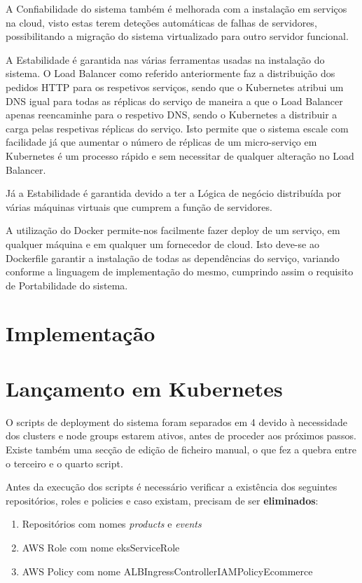 \documentclass[11pt,a4paper]{article}
\begin{document}
A Confiabilidade do sistema também é melhorada com a instalação em serviços na cloud, visto estas terem deteções automáticas de falhas de servidores, possibilitando a migração do sistema virtualizado para outro servidor funcional.
\newline

A Estabilidade é garantida nas várias ferramentas usadas na instalação do sistema. O Load Balancer como referido anteriormente faz a distribuição dos pedidos HTTP para os respetivos serviços, sendo que o Kubernetes atribui um DNS igual para todas as réplicas do serviço de maneira a que o Load Balancer apenas reencaminhe para o respetivo DNS, sendo o Kubernetes a distribuir a carga pelas respetivas réplicas do serviço. Isto permite que o sistema escale com facilidade já que aumentar o número de réplicas de um micro-serviço em Kubernetes é um processo rápido e sem necessitar de qualquer alteração no Load Balancer.
\newline

Já a Estabilidade é garantida devido a ter a Lógica de negócio distribuída por várias máquinas virtuais que cumprem a função de servidores.
\newline


A utilização do Docker permite-nos facilmente fazer deploy de um serviço, em qualquer máquina e em qualquer um fornecedor de cloud. Isto deve-se ao Dockerfile garantir a instalação de todas as dependências do serviço, variando conforme a linguagem de implementação do mesmo, cumprindo assim o requisito de Portabilidade do sistema.

\section{Implementação}

\section{Lançamento em Kubernetes}
O scripts de deployment do sistema foram separados em 4 devido à necessidade dos clusters e node groups estarem ativos, antes de proceder aos próximos passos. Existe também uma secção de edição de ficheiro manual, o que fez a quebra entre o terceiro e o quarto script.

Antes da execução dos scripts é necessário verificar a existência dos seguintes repositórios, roles e policies e caso existam, precisam de ser \textbf{eliminados}:
\begin{enumerate}
	\item Repositórios com nomes \textit{products} e \textit{events}
	\item AWS Role com nome eksServiceRole
	\item AWS Policy com nome ALBIngressControllerIAMPolicyEcommerce
\end{enumerate}
\end{document}
